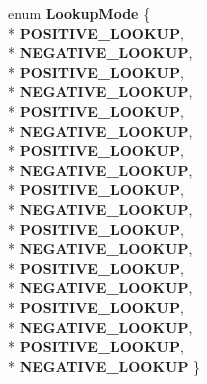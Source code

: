 \begin{DoxyCompactItemize}
\item 
enum {\bfseries Lookup\+Mode} \{ \\*
{\bfseries P\+O\+S\+I\+T\+I\+V\+E\+\_\+\+L\+O\+O\+K\+UP}, 
\\*
{\bfseries N\+E\+G\+A\+T\+I\+V\+E\+\_\+\+L\+O\+O\+K\+UP}, 
\\*
{\bfseries P\+O\+S\+I\+T\+I\+V\+E\+\_\+\+L\+O\+O\+K\+UP}, 
\\*
{\bfseries N\+E\+G\+A\+T\+I\+V\+E\+\_\+\+L\+O\+O\+K\+UP}, 
\\*
{\bfseries P\+O\+S\+I\+T\+I\+V\+E\+\_\+\+L\+O\+O\+K\+UP}, 
\\*
{\bfseries N\+E\+G\+A\+T\+I\+V\+E\+\_\+\+L\+O\+O\+K\+UP}, 
\\*
{\bfseries P\+O\+S\+I\+T\+I\+V\+E\+\_\+\+L\+O\+O\+K\+UP}, 
\\*
{\bfseries N\+E\+G\+A\+T\+I\+V\+E\+\_\+\+L\+O\+O\+K\+UP}, 
\\*
{\bfseries P\+O\+S\+I\+T\+I\+V\+E\+\_\+\+L\+O\+O\+K\+UP}, 
\\*
{\bfseries N\+E\+G\+A\+T\+I\+V\+E\+\_\+\+L\+O\+O\+K\+UP}, 
\\*
{\bfseries P\+O\+S\+I\+T\+I\+V\+E\+\_\+\+L\+O\+O\+K\+UP}, 
\\*
{\bfseries N\+E\+G\+A\+T\+I\+V\+E\+\_\+\+L\+O\+O\+K\+UP}, 
\\*
{\bfseries P\+O\+S\+I\+T\+I\+V\+E\+\_\+\+L\+O\+O\+K\+UP}, 
\\*
{\bfseries N\+E\+G\+A\+T\+I\+V\+E\+\_\+\+L\+O\+O\+K\+UP}, 
\\*
{\bfseries P\+O\+S\+I\+T\+I\+V\+E\+\_\+\+L\+O\+O\+K\+UP}, 
\\*
{\bfseries N\+E\+G\+A\+T\+I\+V\+E\+\_\+\+L\+O\+O\+K\+UP}, 
\\*
{\bfseries P\+O\+S\+I\+T\+I\+V\+E\+\_\+\+L\+O\+O\+K\+UP}, 
\\*
{\bfseries N\+E\+G\+A\+T\+I\+V\+E\+\_\+\+L\+O\+O\+K\+UP}
 \}\hypertarget{classv8_1_1internal_1_1_name_dictionary_lookup_stub_a374c659f56a0459475626d635b65be55}{}\label{classv8_1_1internal_1_1_name_dictionary_lookup_stub_a374c659f56a0459475626d635b65be55}

\end{DoxyCompactItemize}
